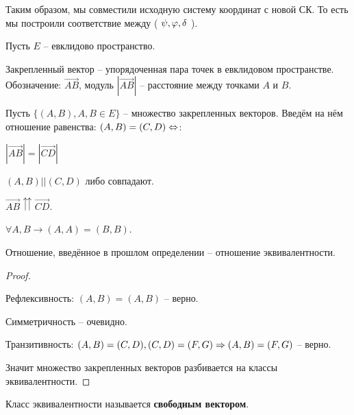 	\begin{figure*}[H]
		\centering
		\def\svgwidth{0.3\columnwidth}
		
	\end{figure*}

	Таким образом, мы совместили исходную систему координат с новой СК. То есть
	мы построили соответствие между ( $\psi, \varphi, \delta$ ).
	

	Пусть $E$ -- евклидово пространство.
	\begin{Def}
		Закрепленный вектор -- упорядоченная пара точек в евклидовом пространстве.
		Обозначение: $\overrightarrow{AB}$, модуль $|\overrightarrow{AB}|$ -- расстояние между точками $A$ и $B$.
	\end{Def}

	\begin{Def}
		Пусть $\{(A, B), A, B \in E\}$ -- множество закрепленных векторов. Введём на нём отношение равенства:
		$(A, B) = (C, D) \Leftrightarrow$:
		\begin{MyList}
			\item $|\overrightarrow{AB}| = |\overrightarrow{CD}|$ 
			\item $(A, B) || (C, D)$ либо совпадают.
			\item $\overrightarrow{AB} \upuparrows \overrightarrow{CD}$. 
		\end{MyList}
	\end{Def}

	\begin{Rem}
		$\forall A, B \to (A, A) = (B, B)$.
	\end{Rem}

	\begin{Prop}
		Отношение, введённое в прошлом определении -- отношение эквивалентности.
	\end{Prop}

	\begin{proof}
		\begin{MyList}
			\item Рефлексивность: $(A, B) = (A, B)$ -- верно.
			\item Симметричность -- очевидно.
			\item Транзитивность: $(A, B) = (C, D), (C, D) = (F, G) \Rightarrow (A, B) = (F, G)$ -- верно.
		\end{MyList}
		Значит множество закрепленных векторов разбивается на классы эквивалентности.
	\end{proof}

	\begin{Def}
		Класс эквивалентности называется \textbf{свободным вектором}.
	\end{Def}

